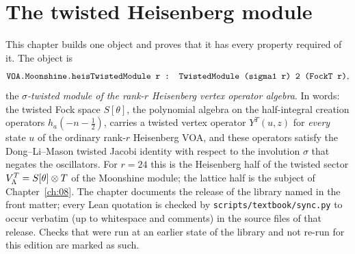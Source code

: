 \chapter{The twisted Heisenberg module}\label{ch:07}

\providecommand{\chsevenF}{\widetilde{F}}
\providecommand{\chsevenst}{\mathbin{\star}}

This chapter builds one object and proves that it has every property required of it. The
object is
\begin{equation*}
  \lean{VOA.Moonshine.heisTwistedModule r : TwistedModule (sigma1 r) 2 (FockT r)},
\end{equation*}
the \emph{$\sigma$-twisted module of the rank-$r$ Heisenberg vertex operator algebra}. In words:
the twisted Fock space $S[\theta]$, the polynomial algebra on the half-integral creation
operators $h_a(-n-\tfrac12)$, carries a twisted vertex operator $Y^T(u,z)$ for \emph{every}
state $u$ of the ordinary rank-$r$ Heisenberg VOA, and these operators satisfy the
Dong--Li--Mason twisted Jacobi identity with respect to the involution $\sigma$ that negates the
oscillators. For $r = 24$ this is the Heisenberg half of the twisted sector $V_{\Lambda}^T =
S[\theta]\otimes T$ of the Moonshine module; the lattice half is the subject of
Chapter~\ref{ch:08}. The chapter documents the release of the library named in the front matter; every Lean quotation is checked by \texttt{scripts/textbook/sync.py} to occur verbatim
(up to whitespace and comments) in the source files of that release. Checks that were run at an earlier state of the library and not re-run for this edition are marked as such.

